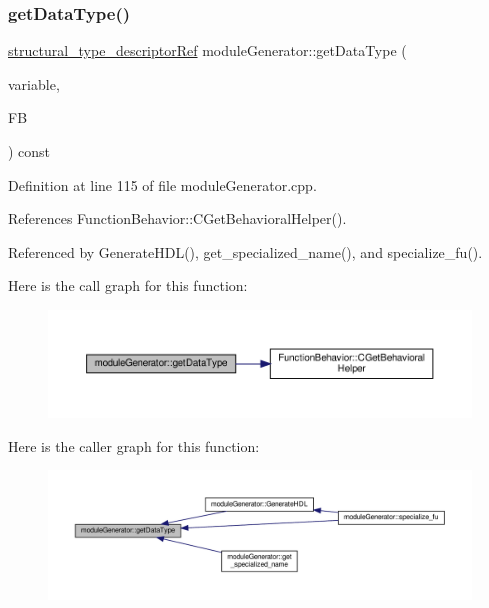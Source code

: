 \subsubsection{\texorpdfstring{get\+Data\+Type()}{getDataType()}}
{\footnotesize\ttfamily \hyperlink{structural__objects_8hpp_a219296792577e3292783725961506c83}{structural\+\_\+type\+\_\+descriptor\+Ref} module\+Generator\+::get\+Data\+Type (\begin{DoxyParamCaption}\item[{unsigned int}]{variable,  }\item[{const \hyperlink{function__behavior_8hpp_a94872da12ed056b6ecf90456164e0213}{Function\+Behavior\+Const\+Ref}}]{FB }\end{DoxyParamCaption}) const}



Definition at line 115 of file module\+Generator.\+cpp.



References Function\+Behavior\+::\+C\+Get\+Behavioral\+Helper().



Referenced by Generate\+H\+D\+L(), get\+\_\+specialized\+\_\+name(), and specialize\+\_\+fu().

Here is the call graph for this function\+:
\nopagebreak
\begin{figure}[H]
\begin{center}
\leavevmode
\includegraphics[width=350pt]{d4/d94/classmoduleGenerator_a605b5c0840854b2854a3b966c23bd8ca_cgraph}
\end{center}
\end{figure}
Here is the caller graph for this function\+:
\nopagebreak
\begin{figure}[H]
\begin{center}
\leavevmode
\includegraphics[width=350pt]{d4/d94/classmoduleGenerator_a605b5c0840854b2854a3b966c23bd8ca_icgraph}
\end{center}
\end{figure}
\mbox{\label{classmoduleGenerator_a19de634fa61dcfbced40c67c1eb73027}} 
